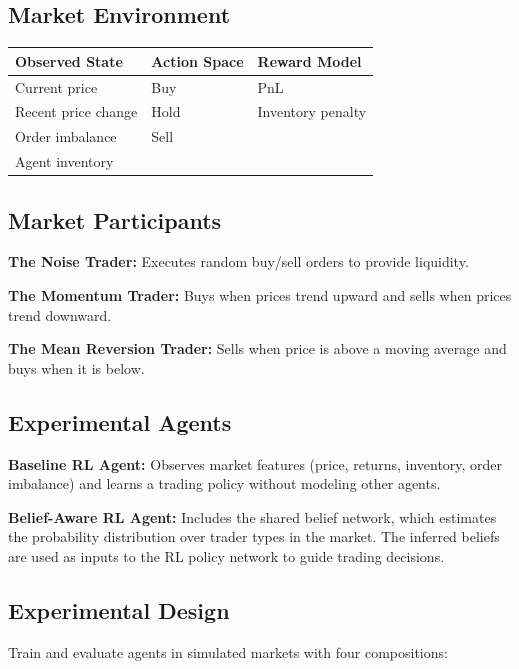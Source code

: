 \documentclass[11pt, a4paper]{article}
\begin{document}
\subsection{Market Environment}

\begin{center}
\begin{tabular}{lll}
\toprule
\textbf{Observed State} & \textbf{Action Space} & \textbf{Reward Model} \\
\midrule
Current price & Buy & PnL \\
Recent price change & Hold & Inventory penalty \\
Order imbalance & Sell & \\
Agent inventory & & \\
\bottomrule
\end{tabular}
\end{center}

\subsection{Market Participants}

\textbf{The Noise Trader:} Executes random buy/sell orders to provide liquidity.

\textbf{The Momentum Trader:} Buys when prices trend upward and sells when prices trend downward.

\textbf{The Mean Reversion Trader:} Sells when price is above a moving average and buys when it is below.

\subsection{Experimental Agents}

\textbf{Baseline RL Agent:} Observes market features (price, returns, inventory, order imbalance) and learns a trading policy without modeling other agents.

\textbf{Belief-Aware RL Agent:} Includes the shared belief network, which estimates the probability distribution over trader types in the market. The inferred beliefs are used as inputs to the RL policy network to guide trading decisions.

\subsection{Experimental Design}

Train and evaluate agents in simulated markets with four compositions:
\end{document}

